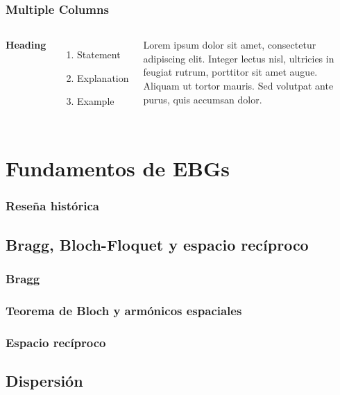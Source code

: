 \documentclass{beamer}
\begin{document}
\begin{frame}
\frametitle{Multiple Columns}
\begin{columns}[c] %

\textbf{Heading}
\begin{enumerate}
\item Statement
\item Explanation
\item Example
\end{enumerate}

Lorem ipsum dolor sit amet, consectetur adipiscing elit. Integer lectus nisl, ultricies in feugiat rutrum, porttitor sit amet augue. Aliquam ut tortor mauris. Sed volutpat ante purus, quis accumsan dolor.

\end{columns}
\end{frame}




\section{Fundamentos de EBGs}

	\begin{frame}
	\frametitle{Reseña histórica}
	\end{frame}
	
	\subsection{Bragg, Bloch-Floquet y espacio recíproco}
	
		\begin{frame}
		\frametitle{Bragg}
		\end{frame}
	
		\begin{frame}
		\frametitle{Teorema de Bloch y armónicos espaciales}
		\end{frame}
	
		\begin{frame}
		\frametitle{Espacio recíproco}
		\end{frame}
	
	\subsection{Dispersión}
	
\end{document}
